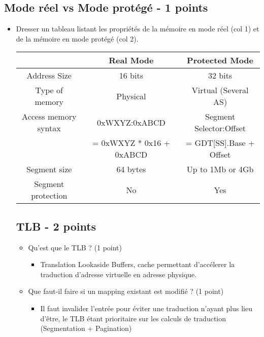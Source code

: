 \begin{correction}
\subsection{Mode r\'eel vs Mode prot\'eg\'e - 1 points}
\begin{itemize}
   \item Dresser un tableau listant les propri\'et\'es de la m\'emoire en mode r\'eel (col 1) et de la m\'emoire en mode prot\'eg\'e (col 2).
    \begin{itemize}
      \begin{tabular}{|c|c|c|}
          \hline
   	  & Real Mode & Protected Mode\\
	  \hline
	  Address Size & 16 bits & 32 bits\\
	  \hline
          Type of memory & Physical & Virtual (Several AS)\\
	  \hline
	  Access memory syntax & 0xWXYZ:0xABCD & Segment Selector:Offset\\
	  & = 0xWXYZ * 0x16 + 0xABCD & = GDT[SS].Base + Offset\\
	  \hline
	  Segment size & 64 bytes & Up to 1Mb or 4Gb \\
	  \hline
	  Segment protection & No & Yes\\
 	  \hline
       \end{tabular}
    \end{itemize}

\subsection{TLB - 2 points}
\begin{itemize}
   \item Qu'est que le TLB ? (1 point)
   \begin{itemize}
       \item Translation Lookaside Buffers, cache permettant d'acc\'elerer la traduction d'adresse virtuelle en adresse physique.
   \end{itemize}

   \item Que faut-il faire si un mapping existant est modifi\'e ? (1 point)
   \begin{itemize}
        \item Il faut invalider l'entr\'ee pour \'eviter une traduction n'ayant plus lieu d'être, le TLB \'etant prioritaire sur les calculs de traduction (Segmentation + Pagination)
   \end{itemize}
\end{itemize}


\end{itemize}
\end{correction}
